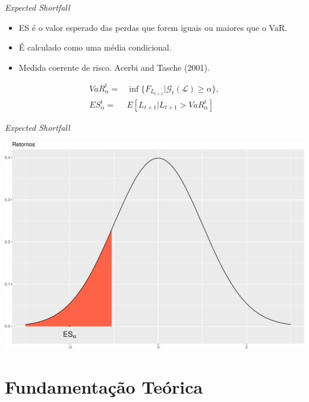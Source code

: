 \documentclass[ignorenonframetext,]{beamer}
\providecommand{\tightlist}{%
\setlength{\itemsep}{0pt}\setlength{\parskip}{0pt}}
\begin{document}
\begin{frame}{\emph{Expected Shortfall}}

\begin{itemize}
\tightlist
\item
  ES é o valor esperado das perdas que forem iguais ou maiores que o
  VaR.
\item
  É calculado como uma média condicional.
\item
  Medida coerente de risco. Acerbi and Tasche (2001).
\end{itemize}

\begin{align*}
VaR_\alpha^t=&\inf\{F_{L_{t+1}} | \mathcal{G}_t(\mathcal{L}) \geq \alpha\}, \\
ES_\alpha^t=&E[L_{t+1} | L_{t+1} > VaR_\alpha^t]
\end{align*}

\end{frame}

\begin{frame}{\emph{Expected Shortfall}}

\includegraphics{artigo-apresentacao_files/figure-beamer/ES-1.pdf}

\end{frame}

\section{Fundamentação Teórica}\label{fundamentacao-teorica}
\end{document}
